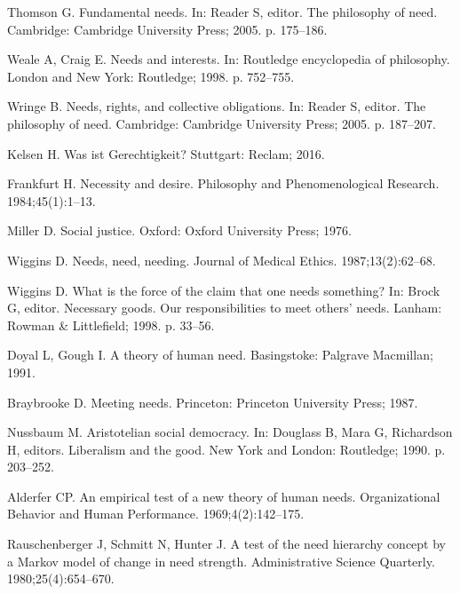 \documentclass[10pt,letterpaper]{article}
\begin{document}
\begin{thebibliography}{100}
Thomson G.
\newblock Fundamental needs.
\newblock In: Reader S, editor. The philosophy of need. Cambridge: Cambridge
  University Press; 2005. p. 175--186.

Weale A, Craig E.
\newblock Needs and interests.
\newblock In: Routledge encyclopedia of philosophy. London and New York:
  Routledge; 1998. p. 752--755.

Wringe B.
\newblock Needs, rights, and collective obligations.
\newblock In: Reader S, editor. The philosophy of need. Cambridge: Cambridge
  University Press; 2005. p. 187--207.

Kelsen H.
\newblock Was ist {Gerechtigkeit}?
\newblock Stuttgart: Reclam; 2016.

Frankfurt H.
\newblock Necessity and desire.
\newblock Philosophy and Phenomenological Research. 1984;45(1):1--13.

Miller D.
\newblock Social justice.
\newblock Oxford: Oxford University Press; 1976.

Wiggins D.
\newblock Needs, need, needing.
\newblock Journal of Medical Ethics. 1987;13(2):62--68.

Wiggins D.
\newblock What is the force of the claim that one needs something?
\newblock In: Brock G, editor. Necessary goods. {Our} responsibilities to meet
  others' needs. Lanham: Rowman \& Littlefield; 1998. p. 33--56.

Doyal L, Gough I.
\newblock A theory of human need.
\newblock Basingstoke: Palgrave Macmillan; 1991.

Braybrooke D.
\newblock Meeting needs.
\newblock Princeton: Princeton University Press; 1987.

Nussbaum M.
\newblock Aristotelian social democracy.
\newblock In: Douglass B, Mara G, Richardson H, editors. Liberalism and the
  good. New York and London: Routledge; 1990. p. 203--252.

Alderfer CP.
\newblock An empirical test of a new theory of human needs.
\newblock Organizational Behavior and Human Performance. 1969;4(2):142--175.

Rauschenberger J, Schmitt N, Hunter J.
\newblock A test of the need hierarchy concept by a {Markov} model of change in
  need strength.
\newblock Administrative Science Quarterly. 1980;25(4):654--670.


\end{thebibliography}
\end{document}
